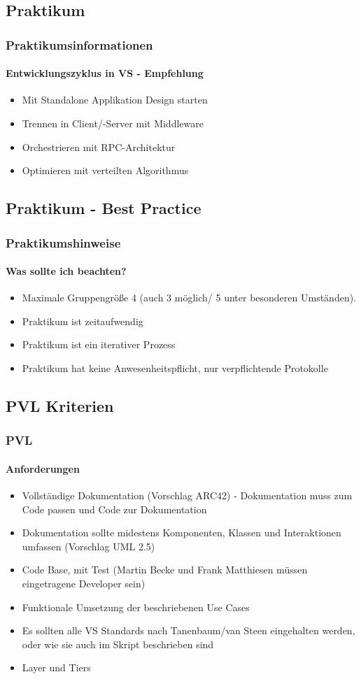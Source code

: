 \subsection{Praktikum}
\begin{frame}
  \frametitle{Praktikumsinformationen}
  \framesubtitle{Entwicklungszyklus in VS - Empfehlung}
  \begin{itemize}
    \item Mit Standalone Applikation Design starten
    \item Trennen in Client/-Server mit Middleware
    \item Orchestrieren mit RPC-Architektur 
    \item Optimieren mit verteilten Algorithmus
  \end{itemize}
\end{frame}

\subsection{Praktikum - Best Practice}
\begin{frame}
  \frametitle{Praktikumshinweise}
  \framesubtitle{Was sollte ich beachten?}
  \begin{itemize}
    \item Maximale Gruppengröße 4 (auch 3 möglich/ 5 unter besonderen Umständen).
    \item Praktikum ist zeitaufwendig 
    \item Praktikum ist ein iterativer Prozess 
    \item Praktikum hat keine Anwesenheitspflicht, nur verpflichtende Protokolle
  \end{itemize}
\end{frame}

\subsection{PVL Kriterien}
\begin{frame}
  \frametitle{PVL}
  \framesubtitle{Anforderungen}
  \begin{itemize}
    \item Vollständige Dokumentation (Vorschlag ARC42) - Dokumentation muss zum Code passen und Code zur Dokumentation
    \item Dokumentation sollte midestens Komponenten, Klassen und Interaktionen umfassen (Vorschlag UML 2.5)
    \item Code Base, mit Test (Martin Becke und Frank Matthiesen müssen eingetragene Developer sein)
    \item Funktionale Umsetzung der beschriebenen Use Cases 
    \item Es sollten alle VS Standards nach Tanenbaum/van Steen eingehalten werden, oder wie sie auch im Skript beschrieben sind
    \item Layer und Tiers
  \end{itemize}

\end{frame}